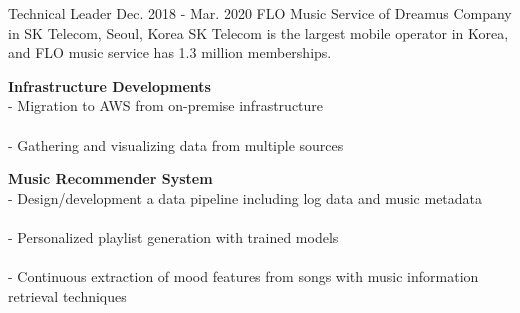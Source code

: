 \begin{cventries}
    \cventry
        {Technical Leader} %
        {Dec. 2018 - Mar. 2020} %
        {FLO Music Service of Dreamus Company in SK Telecom, } %
        {Seoul, Korea}%
        { %
            SK Telecom is the largest mobile operator in Korea, and FLO music service has 1.3 million memberships.
        }
        { %
            \begin{cvitems}
                \item {
                    {\bf Infrastructure Developments} \\
                    - Migration to AWS from on-premise infrastructure \\
                         \\
                    - Gathering and visualizing data from multiple sources \\
                         \nn
                }
                \item {
                    {\bf Music Recommender System} \\
                    - Design/development a data pipeline including log data and music metadata \\
                         \\
                    - Personalized playlist generation with trained models \\
                         \\
                    - Continuous extraction of mood features from songs with music information retrieval techniques \\
                         \nn
                }
            \end{cvitems}
        }


\end{cventries}
